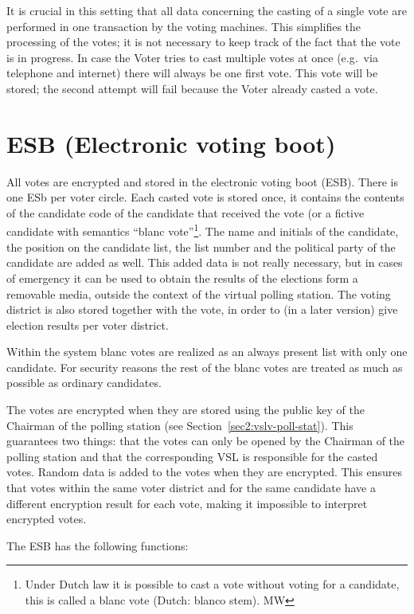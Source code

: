 It is crucial in this setting that all data concerning the casting of
a single vote are performed in one transaction by the voting
machines. This simplifies the processing of the votes; it is not
necessary to keep track of the fact that the vote is in progress. In
case the Voter tries to cast multiple votes at once (e.g.\ via
telephone and internet) there will always be one first vote. This vote
will be stored; the second attempt will fail because the Voter already
casted a vote.

\section{ESB (Electronic voting boot)}\label{sec2:esbel-voting-boot}

All votes are encrypted and stored in the electronic voting boot
(ESB). There is one ESb per voter circle. Each casted vote is stored
once, it contains the contents of the candidate code of the candidate
that received the vote (or a fictive candidate with semantics ``blanc
vote''\footnote{Under Dutch law it is possible to cast a vote without
voting for a candidate, this is called a blanc vote (Dutch: blanco
stem). MW}. The name and initials of the candidate, the position on
the candidate list, the list number and the political party of the
candidate are added as well. This added data is not really necessary,
but in cases of emergency it can be used to obtain the results of the
elections form a removable media, outside the context of the virtual
polling station. The voting district is also stored together with the
vote, in order to (in a later version) give election results per voter
district.

Within the system blanc votes are realized as an always present list
with only one candidate. For security reasons the rest of the blanc
votes are treated as much as possible as ordinary candidates.

The votes are encrypted when they are stored using the public key of
the Chairman of the polling station (see
Section~\ref{sec2:vslv-poll-stat}). This guarantees two things: that
the votes can only be opened by the Chairman of the polling station
and that the corresponding VSL is responsible for the casted
votes. Random data is added to the votes when they are encrypted. This
ensures that votes within the same voter district and for the same
candidate have a different encryption result for each vote, making it
impossible to interpret encrypted votes.

The ESB has the following functions:

